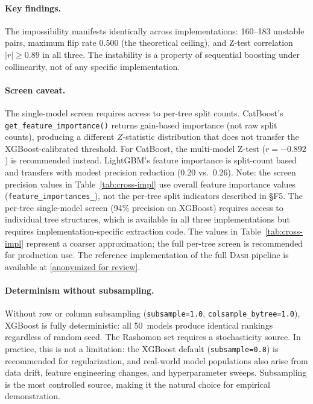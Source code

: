 \documentclass{article}
\newcommand{\DASH}{\textsc{Dash}}
\begin{document}
\paragraph{Key findings.}
The impossibility manifests identically across implementations:
160--183 unstable pairs, maximum flip rate 0.500 (the theoretical
ceiling), and Z-test correlation $|r| \geq 0.89$ in all three.
The instability is a property of sequential boosting under
collinearity, not of any specific implementation.

\paragraph{Screen caveat.}
The single-model screen requires access to per-tree split
counts. CatBoost's \texttt{get\_feature\_importance()} returns
gain-based importance (not raw split counts), producing a different
$Z$-statistic distribution that does not transfer the XGBoost-calibrated
threshold. For CatBoost, the multi-model Z-test ($r = -0.892$)
is recommended instead. LightGBM's feature importance is split-count
based and transfers with modest precision reduction (0.20 vs.\ 0.26).
Note: the screen precision values in Table~\ref{tab:cross-impl} use overall
feature importance values (\texttt{feature\_importances\_}), not the
per-tree split indicators described in \S F5. The per-tree single-model screen
(94\% precision on XGBoost) requires access to individual tree structures,
which is available in all three implementations but requires
implementation-specific extraction code. The values in
Table~\ref{tab:cross-impl} represent a coarser approximation; the full
per-tree screen is recommended for production use.
The reference implementation of the full \DASH{} pipeline is available
at \url{[anonymized for review]}.

\paragraph{Determinism without subsampling.}
Without row or column subsampling (\texttt{subsample=1.0},
\texttt{colsample\_bytree=1.0}), XGBoost is fully deterministic:
all 50~models produce identical rankings regardless of random seed.
The Rashomon set requires a stochasticity source. In practice, this
is not a limitation: the XGBoost default (\texttt{subsample=0.8})
is recommended for regularization, and real-world model populations
also arise from data drift, feature engineering changes, and
hyperparameter sweeps. Subsampling is the most controlled source,
making it the natural choice for empirical demonstration.
\end{document}
